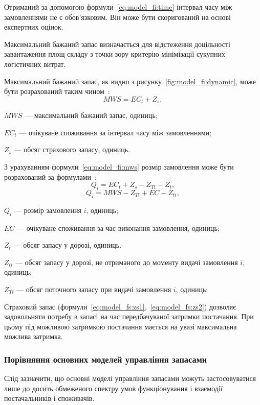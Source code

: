Отриманий за допомогою формули~\eqref{eq:model_fi:time} інтервал часу між замовленнями не є обов'язковим.
Він може бути скоригований на основі експертних оцінок.

Максимальний бажаний запас визначається для відстеження доцільності завантаження площ складу з точки зору критерію мінімізації сукупних логістичних витрат.

Максимальний бажаний запас, як видно з рисунку~\ref{fig:model_fi:dynamic}, може бути розрахований таким чином~\cite{Sterligova2008}:
\begin{equation} \label{eq:model_fi:mws}
MWS=EC_t+Z_s
,
\end{equation}
\begin{description}
	\item[де] $MWS$ --- максимальний бажаний запас, одиниць;
	\item $EC_t$ --- очікуване споживання за інтервал часу між замовленнями;
	\item $Z_s$ --- обсяг страхового запасу, одиниць.
\end{description}

З урахуванням формули~\eqref{eq:model_fi:mws} розмір замовлення може бути розрахований за формулами~\cite{Sterligova2008}:
\begin{equation} \label{eq:order}
Q_i=EC_t+Z_s-Z_{Ti}-Z_t
,
\end{equation}
\begin{equation} \label{eq:order2}
Q_i=MWS-Z_{Ti}+EC-Z_{ti}
,
\end{equation}
\begin{description}
	\item[де] $Q_i$ --- розмір замовлення $i$, одиниць;
	\item $EC$ --- очікуване споживання за час виконання замовлення, одиниць;
	\item $Z_t$ --- обсяг запасу у дорозі, одиниць.
	\item $Z_{ti}$ --- обсяг запасу у дорозі, не отриманого до моменту видачі замовлення $i$, одиниць;
	\item $Z_{Ti}$ --- обсяг поточного запасу при видачі замовлення $i$, одиниць;
\end{description}

Страховий запас (формули~\ref{eq:model_fs:zs1},~\ref{eq:model_fs:zs2}) дозволяє задовольняти потребу в запасі на час передбачуваної затримки постачання.
При цьому під можливою затримкою постачання мається на увазі максимальна можлива затримка.

\subsubsection{Порівняння основних моделей управління запасами}
Слід зазначити, що основні моделі управління запасами можуть застосовуватися лише до досить обмеженого спектру умов функціонування і взаємодії постачальників і споживачів.

